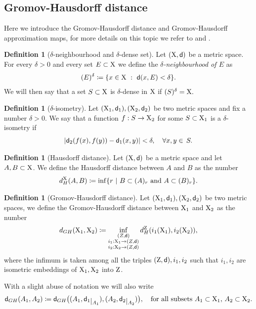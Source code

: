 \documentclass[11pt]{article}
\newcommand{\sfd}{{\sf d}}
\newcommand{\restr}[1]{\lower3pt\hbox{$|_{#1}$}}
\newcommand{\X}{{\rm X}}
\newcommand{\Z}{{\rm Z}}
\theoremstyle{plain}
\theoremstyle{definition}
\newtheorem{definition}[theorem]{Definition}
\numberwithin{equation}{section}
\begin{document}
\subsection{Gromov-Hausdorff distance}
Here we introduce  the Gromov-Hausdorff distance and  Gromov-Hausdorff approximation maps, for  more details on this topic we refer to \cite{burago} and \cite{gromov}.

\begin{definition}[$\delta$-neighbourhood and $\delta$-dense set]
	Let $(\X,\sfd)$ be a metric space. For every $\delta>0$ and every set $E\subset \X$ we define the \textit{$\delta$-neighbourhood of $E$} as
 \[
 (E)^\delta\coloneqq \{x \in \X \ : \ \sfd(x,E)<\delta\}.
 \]
We will then say that a set $S\subset \X$ is $\delta$-dense in $\X$ if $(S)^\delta=\X.$
\end{definition} 


\begin{definition}[$\delta$-isometry]
	Let $(\X_1,\sfd_1),(\X_2,\sfd_2)$ be two metric spaces and fix a number $\delta>0$. We say that a function $f : S \to \X_2$  for some $S \subset \X_1$  is a $\delta$-isometry if
	\[|\sfd_2(f(x),f(y))-\sfd_1(x,y)|< \delta, \quad \forall x,y \in \,S.\]
\end{definition} 



\begin{definition}[Hausdorff distance]\label{dh}
	Let $(\X,\sfd)$ be a metric space and let $A,B\subset \X$. We define the Hausdorff distance between $A$ and $B$ as the number
	\[d^{\X}_H(A,B)\coloneqq\inf \{r \ | \  B\subset (A)_r \text{ and } A\subset (B)_r \}.\]
\end{definition}

\begin{definition}[Gromov-Hausdorff distance] \label{GHdef}
	Let $(\X_1,\sfd_1),(\X_2,\sfd_2)$ be two metric spaces, we define the Gromov-Hausdorff distance between $\X_1$ and $\X_2$ as the number
	\[d_{GH}(\X_1,\X_2)\coloneqq\inf_{\substack{{(Z,\sfd)}\\{i_1 : \X_1 \to (Z,\sfd)}\\{i_2 : \X_2 \to (Z,\sfd )}}}  d^{\Z}_H(i_1(\X_1),i_2(\X_2)),\]
	where the infimum is taken among all the triples $(\Z,\sfd),i_1,i_2$ such that  $i_1,i_2$ are isometric embeddings of $\X_1,\X_2$ into  $\Z$. 
\end{definition}
With a slight abuse of notation we will also write 
\[
\sfd_{GH}(A_1,A_2)\coloneqq \sfd_{GH}\big((A_1,\sfd_1\restr {A_1}),(A_2,\sfd_2\restr {A_2})\big), \quad \text{for all subsets $A_1\subset \X_1$, $A_2\subset \X_2$}.
\]
\end{document}
